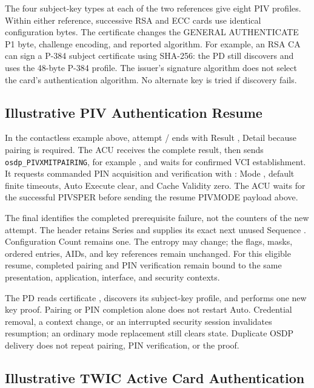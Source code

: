 The four subject-key types at each of the two references give eight PIV profiles.
Within either reference, successive RSA and ECC cards use identical configuration
bytes. The certificate changes the GENERAL AUTHENTICATE P1 byte, challenge
encoding, and reported algorithm. For example, an RSA CA can sign a P-384
subject certificate using SHA-256: the PD still discovers  and uses
the 48-byte P-384 profile. The issuer's signature algorithm does not select the
card's authentication algorithm. No alternate key is tried if discovery fails.

\subsection{Illustrative PIV Authentication Resume}

In the contactless  example above, attempt /
 ends with Result , Detail  because
pairing is required. The ACU receives the complete result, then sends
\texttt{osdp\_PIVXMITPAIRING}, for example
, and waits for confirmed VCI establishment.
It requests commanded PIN acquisition and verification with
: Mode , default finite timeouts,
Auto Execute clear, and Cache Validity zero. The ACU waits for the successful
PIVSPER before sending the resume PIVMODE payload above.

The final  identifies the completed prerequisite
failure, not the counters of the new attempt. The header retains Series
 and supplies its exact next unused Sequence
. Configuration Count remains one. The entropy may change;
the flags, masks, ordered entries, AIDs, and key references remain unchanged.
For this eligible resume, completed pairing and PIN verification remain bound
to the same presentation, application, interface, and security contexts.

The PD reads certificate , discovers its subject-key profile,
and performs one new key proof. Pairing or PIN completion alone does not restart
Auto. Credential removal, a context change, or an interrupted security session
invalidates resumption; an ordinary mode replacement still clears state.
Duplicate OSDP delivery does not repeat pairing, PIN verification, or the proof.

\subsection{Illustrative TWIC Active Card Authentication}

